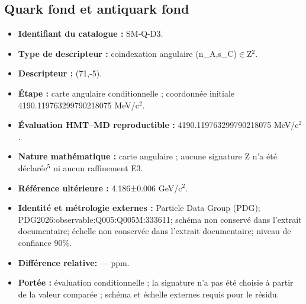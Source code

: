 \subsection{Quark fond et antiquark fond}
\begin{itemize}
\item \textbf{Identifiant du catalogue :} SM-Q-D3.
\item \textbf{Type de descripteur :} coindexation angulaire (n\_A,s\_C)\(\in\)Z\({}^{2}\).
\item \textbf{Descripteur :} (71,-5).
\item \textbf{Étape :} carte angulaire conditionnelle ; coordonnée initiale 4190.119763\allowbreak{}299790\allowbreak{}218075 MeV/c\({}^{2}\).
\item \textbf{Évaluation HMT--MD reproductible :} 4190.119763\allowbreak{}299790\allowbreak{}218075 MeV/c\({}^{2}\).
\item \textbf{Nature mathématique :} carte angulaire ; aucune signature Z n’a été déclarée\({}^{5}\) ni aucun raffinement E3.
\item \textbf{Référence ultérieure :} 4.186±\allowbreak{}0.006 GeV/c\({}^{2}\).
\item \textbf{Identité et métrologie externes :} Particle Data Group (PDG); PDG2026:\allowbreak{}observable:\allowbreak{}Q005:\allowbreak{}Q005M:\allowbreak{}333611; schéma non conservé dans l’extrait documentaire; échelle non conservée dans l’extrait documentaire; niveau de confiance 90\%.
\item \textbf{Différence relative:} --- ppm.
\item \textbf{Portée :} évaluation conditionnelle ; la signature n’a pas été choisie à partir de la valeur comparée ; schéma et échelle externes requis pour le résidu.
\end{itemize}
